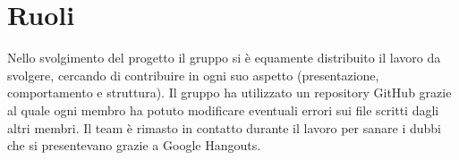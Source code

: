 \section{Ruoli}
Nello svolgimento del progetto il gruppo si è equamente distribuito il lavoro da svolgere, cercando di contribuire in ogni suo aspetto (presentazione, comportamento e struttura).
Il gruppo ha utilizzato un repository GitHub grazie al quale ogni membro ha potuto modificare eventuali errori sui file scritti dagli altri membri. Il team è rimasto in contatto durante il lavoro per sanare i dubbi che si presentevano grazie a Google Hangouts.

